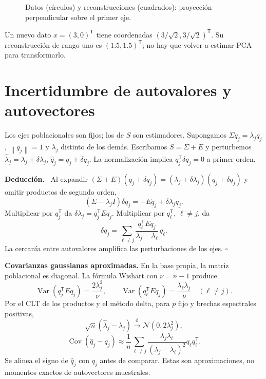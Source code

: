 \documentclass[11pt,a4paper]{article}
\newcommand{\T}{^{\mathsf T}}
\newcommand{\norm}[1]{\left\lVert #1\right\rVert}
\DeclareMathOperator{\Var}{Var}
\DeclareMathOperator{\Cov}{Cov}
\newcommand{\dto}{\xrightarrow{\mathrm d}}
\newcommand{\Normal}{\mathcal N}
\newcommand{\topic}[2]{\clearpage\section{#1}\label{#2}}
\newenvironment{deduccion}{\par\textbf{Deducción.}\ }{\hfill$\square$\par}
\theoremstyle{definition}\newtheorem{definicion}[teorema]{Definición}
\begin{document}
\begin{figure}[H]\centering
{}
\caption{Datos (círculos) y reconstrucciones (cuadrados): proyección perpendicular sobre el primer eje.}
\end{figure}
Un nuevo dato $x=(3,0)\T$ tiene coordenadas
$(3/\sqrt2,3/\sqrt2)\T$. Su reconstrucción de rango uno es
$(1.5,1.5)\T$; no hay que volver a estimar PCA para transformarlo.

\topic{Incertidumbre de autovalores y autovectores}{s31}
Los ejes poblacionales son fijos; los de $S$ son estimadores.
Supongamos $\Sigma q_j=\lambda_jq_j$, $\norm{q_j}=1$ y
$\lambda_j$ distinto de los demás.
Escribamos $S=\Sigma+E$ y perturbemos
$\widehat\lambda_j=\lambda_j+\delta\lambda_j$,
$\widehat q_j=q_j+\delta q_j$.
La normalización implica $q_j\T\delta q_j=0$ a primer orden.

\begin{deduccion}
Al expandir $(\Sigma+E)(q_j+\delta q_j)
=(\lambda_j+\delta\lambda_j)(q_j+\delta q_j)$ y omitir productos
de segundo orden,
\[
(\Sigma-\lambda_jI)\delta q_j
=-Eq_j+\delta\lambda_jq_j.
\]
Multiplicar por $q_j\T$ da
$\delta\lambda_j=q_j\T Eq_j$.
Multiplicar por $q_\ell\T$, $\ell\ne j$, da
\[
\boxed{\delta q_j
=\sum_{\ell\ne j}
\frac{q_\ell\T Eq_j}{\lambda_j-\lambda_\ell}\,q_\ell}.
\]
La cercanía entre autovalores amplifica las perturbaciones de los ejes.
\end{deduccion}
\textbf{Covarianzas gaussianas aproximadas.}
En la base propia, la matriz poblacional es diagonal.
La fórmula Wishart con $\nu=n-1$ produce
\[
\Var(q_j\T Eq_j)=\frac{2\lambda_j^2}{\nu},\qquad
\Var(q_\ell\T Eq_j)=\frac{\lambda_\ell\lambda_j}{\nu}
\quad(\ell\ne j).
\]
Por el CLT de los productos y el método delta, para $p$ fijo y brechas
espectrales positivas,
\[
\sqrt n(\widehat\lambda_j-\lambda_j)
\dto\Normal(0,2\lambda_j^2),
\]
\[
\Cov(\widehat q_j-q_j)\approx
\frac1n\sum_{\ell\ne j}
\frac{\lambda_j\lambda_\ell}{(\lambda_j-\lambda_\ell)^2}
q_\ell q_\ell\T.
\]
Se alinea el signo de $\widehat q_j$ con $q_j$ antes de comparar.
Estas son aproximaciones, no momentos exactos de autovectores muestrales.
\end{document}
